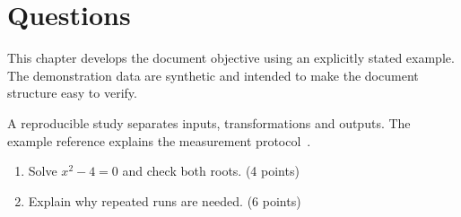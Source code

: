 \section{Questions}


\label{sec:chapter1}
This chapter develops the document objective using an explicitly stated example. The demonstration data are synthetic and intended to make the document structure easy to verify.

A reproducible study separates inputs, transformations and outputs. The example reference explains the measurement protocol~\cite{example}.
\begin{enumerate}
\item Solve $x^2-4=0$ and check both roots. (4 points)
\item Explain why repeated runs are needed. (6 points)
\end{enumerate}
